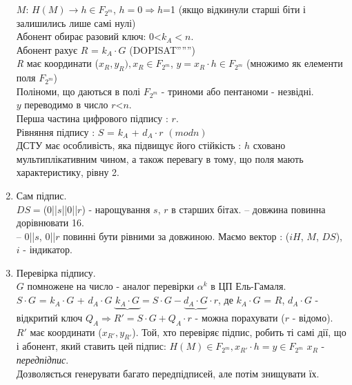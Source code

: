 \begin{enumerate}
        $M$: $H(M)\rightarrow h \in F_{2^{m}}$, $h=0 \Rightarrow h$=1 (якщо відкинули старші біти і залишились лише самі нулі)\\
        Абонент обирає разовий ключ: 0<$k_{A}<n$.\\
        Абонент рахує $R$ = $k_{A} \cdot G$ (DOPISAT'''''')\\
        \textit{R} має координати ($x_{R}, y_{R}), x_{R} \in F_{2^{m}}$, $y=x_{R} \cdot h \in F_{2^{m}}$ (множимо як елементи поля $F_{2^{m}}$)\\
    Поліноми, що даються в полі $F_{2^{m}}$ - триноми або пентаноми - незвідні.\\
$y$ переводимо в число $r$<$n$.\\
Перша частина цифрового підпису : $r$.\\
Рівняння підпису : $S$ = $k_{A}$ + $d_{A} \cdot r$ $(mod n)$\\
ДСТУ має особливість, яка підвищує його стійкість : $h$ сховано мультиплікативним чином, а також перевагу в тому, що поля мають характеристику, рівну 2.\\

\item Сам підпис.\\

$DS = $($0$||$s$||$0$||$r$) - нарощування $s$, $r$ в старших бітах.
-- довжина повинна дорівнювати 16.\\
-- $0$||$s$, $0$||$r$ повинні бути рівними за довжиною.
Маємо вектор : ($iH$, $M$, $DS$), $i$ - індикатор.\\

\item Перевірка підпису.\\

$G$ помножене на число - аналог перевірки $\alpha^{k}$ в ЦП Ель-Гамаля.\\
$S \cdot G$ = $k_{A} \cdot G$ + $d_{A} \cdot G$
$\underbrace{k_{A} \cdot G}=S \cdot G - \underbrace{d_{A} \cdot G} \cdot r$, де $k_{A} \cdot G$ = $R$, $d_{A} \cdot G$ - відкритий ключ $Q_{A}\Rightarrow R'=S \cdot G + Q_{A} \cdot r$ - можна порахувати ($r$ - відомо).\\
$R'$ має координати ($x_{R'}, y_{R'}$).
Той, хто перевіряє підпис, робить ті самі дії, що і абонент, який ставить цей підпис:
$H(M) \in F_{2^{m}}, x_{R'} \cdot h=y \in F_{2^{m}}$
$x_{R}$ - \emph{передпідпис}. \\
Дозволяється генерувати багато передпідписей, але потім знищувати їх.\\
\end{enumerate} 

